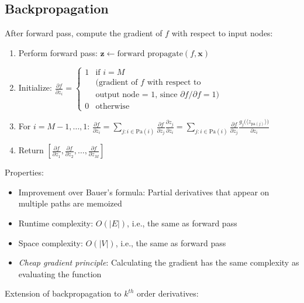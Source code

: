 \subsection*{Backpropagation}
After forward pass, compute the gradient of $f$ with respect to input nodes:
\begin{enumerate}
    \item Perform forward pass: $\boldsymbol{z} \gets \textrm{forward propagate}(f, \boldsymbol{x})$
    \item Initialize:
    $
    \frac{\partial f}{\partial z_i} =
    \begin{cases}
    1 & \textrm{if } i = M\\
     & (\textrm{gradient of } f \textrm{ with respect to}\\
     & \textrm{output node = 1, since } \partial f / \partial f = 1)\\
    0 & \textrm{otherwise}
    \end{cases}
    $
    \item For $i = M-1, \dots, 1$:
    $
    \frac{\partial f}{\partial z_i} = \sum_{j:i \in \textrm{Pa}(i)} \frac{\partial f}{\partial z_j} \frac{\partial z_j}{\partial z_i} = \sum_{j:i \in \textrm{Pa}(i)} \frac{\partial f}{\partial z_j} \frac{g_j\big(\langle z_{\textrm{pa}(j)} \rangle\big)}{\partial z_i}
    $
    \item Return $\left[ \frac{\partial f}{\partial z_1}, \frac{\partial f}{\partial z_2}, \dots, \frac{\partial f}{\partial z_M} \right]$
\end{enumerate}
Properties:
\begin{itemize}
    \item Improvement over Bauer's formula: Partial derivatives that appear on multiple paths are memoized
    \item Runtime complexity: $O(|E|)$, i.e., the same as forward pass
    \item Space complexity: $O(|V|)$, i.e., the same as forward pass
    \item \emph{Cheap gradient principle}: Calculating the gradient has the same complexity as evaluating the function
\end{itemize}
Extension of backpropagation to $k^{th}$ order derivatives:
